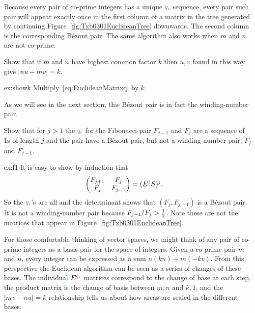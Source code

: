 
Because every pair of co-prime integers has a unique $\jqi$ sequence, every pair such pair will appear exactly once in the first column of a matrix in the tree generated by continuing Figure~\ref{fig:Txb0301EuclideanTree} downwards.
The second column is the corresponding B\'ezout pair. The same algorithm also works when $m$ and $n$ are not co-prime:
\begin{jExercise}\label{ex:showk}
	Show that if $m$ and $n$ have highest common factor $k$ then $u,v$ found in this way give $|nu-mv|=k$.
\end{jExercise}
\begin{jAnswer}{ex:showk}
	Multiply~\eqref{eq:EuclideanMatrixq} by $k$
\end{jAnswer}
As we will see in the next section, this B\'ezout pair is in fact the winding-number pair.

\begin{jExercise}\label{ex:f1}
	Show that for $j>1$ the  $\jqi$ for the Fibonacci pair $F_{j+1}$ and $F_j$ are a sequence of 1s of length $j$ and 
	the pair have a B\'ezout pair, but not a winding-number pair,  $F_j$ and $F_{j-1}$.
\end{jExercise}
\begin{jAnswer}{ex:f1}
		It is easy to show by induction that 
\begin{align}
	\begin{pmatrix} 
		F_{j+1} & F_{j} 
		\\
		F _j & F_{j-1}
	\end{pmatrix} &= 	(E^\jqn{1} S)^{j}.
	\label{eq:FibonacciMatrixB}
\end{align}
So the  $\jqi$'s are all  and the determinant shows that $(F_{j},F_{j-1})$ is a B\'ezout pair. It is not a winding-number pair because $F_{j-1}/F_j>\textstyle{\frac{1}{2}}$. Note these are not the matrices that appear in Figure~\ref{fig:Txb0301EuclideanTree}.
\end{jAnswer}

For those comfortable thinking of vector spaces,  we might think of any pair of co-prime integers as a basis pair for the space of integers.  Given a co-prime pair $m$ and $n$, every integer can be expressed as a sum $n (k u)+ m (-k v)$.  From this perspective the Euclidean algorithm  can  be seen as a series of changes of these bases.  The individual $E^{\jqi}$ matrices correspond to the change of base at each step, the product matrix is the change of basis between $m,n$ and $k,1$, and the $ |mv - nu|=k$ relationship tells us about how areas are scaled in the different bases. 

